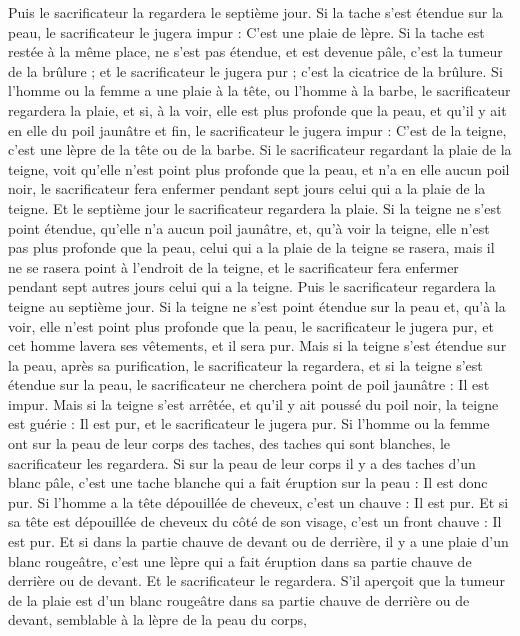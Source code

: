 \begin{multicols}{2}
Puis le sacrificateur la regardera le septième jour. Si la tache s'est étendue sur la peau, le sacrificateur le jugera impur : C'est une plaie de lèpre.
Si la tache est restée à la même place, ne s'est pas étendue, et est devenue pâle, c'est la tumeur de la brûlure ; et le sacrificateur le jugera pur ; c'est la cicatrice de la brûlure.
Si l'homme ou la femme a une plaie à la tête, ou l'homme à la barbe,
le sacrificateur regardera la plaie, et si, à la voir, elle est plus profonde que la peau, et qu'il y ait en elle du poil jaunâtre et fin, le sacrificateur le jugera impur : C'est de la teigne, c'est une lèpre de la tête ou de la barbe.
Si le sacrificateur regardant la plaie de la teigne, voit qu'elle n'est point plus profonde que la peau, et n'a en elle aucun poil noir, le sacrificateur fera enfermer pendant sept jours celui qui a la plaie de la teigne.
Et le septième jour le sacrificateur regardera la plaie. Si la teigne ne s'est point étendue, qu'elle n'a aucun poil jaunâtre, et, qu'à voir la teigne, elle n'est pas plus profonde que la peau,
celui qui a la plaie de la teigne se rasera, mais il ne se rasera point à l'endroit de la teigne, et le sacrificateur fera enfermer pendant sept autres jours celui qui a la teigne.
Puis le sacrificateur regardera la teigne au septième jour. Si la teigne ne s'est point étendue sur la peau et, qu'à la voir, elle n'est point plus profonde que la peau, le sacrificateur le jugera pur, et cet homme lavera ses vêtements, et il sera pur.
Mais si la teigne s'est étendue sur la peau, après sa purification, le sacrificateur la regardera,
et si la teigne s'est étendue sur la peau, le sacrificateur ne cherchera point de poil jaunâtre : Il est impur.
Mais si la teigne s'est arrêtée, et qu'il y ait poussé du poil noir, la teigne est guérie : Il est pur, et le sacrificateur le jugera pur.
Si l'homme ou la femme ont sur la peau de leur corps des taches, des taches qui sont blanches,
le sacrificateur les regardera. Si sur la peau de leur corps il y a des taches d'un blanc pâle, c'est une tache blanche qui a fait éruption sur la peau : Il est donc pur.
Si l'homme a la tête dépouillée de cheveux, c'est un chauve : Il est pur.
Et si sa tête est dépouillée de cheveux du côté de son visage, c'est un front chauve : Il est pur.
Et si dans la partie chauve de devant ou de derrière, il y a une plaie d'un blanc rougeâtre, c'est une lèpre qui a fait éruption dans sa partie chauve de derrière ou de devant.
Et le sacrificateur le regardera. S'il aperçoit que la tumeur de la plaie est d'un blanc rougeâtre dans sa partie chauve de derrière ou de devant, semblable à la lèpre de la peau du corps,

\end{multicols}
